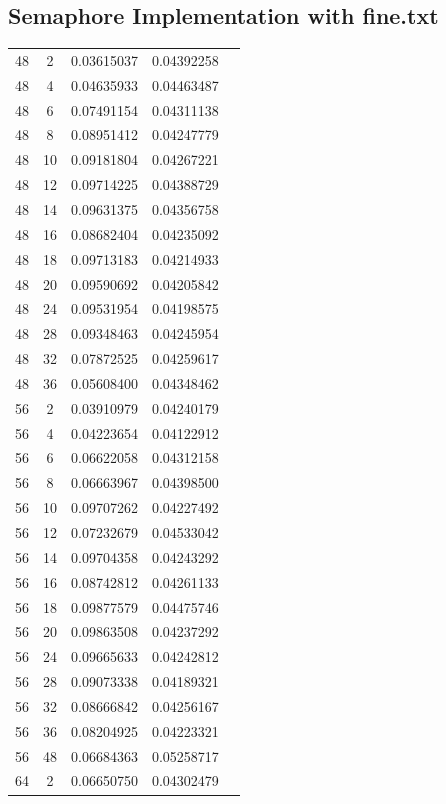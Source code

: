 \documentclass[letterpaper,12pt]{article}
\theoremstyle{remark}
\begin{document}
\subsection*{Semaphore Implementation  with fine.txt}
\begin{tabular}{ccccc}

48 & 2 & 0.03615037 & 0.04392258 \\
48 & 4 & 0.04635933 & 0.04463487 \\
48 & 6 & 0.07491154 & 0.04311138 \\
48 & 8 & 0.08951412 & 0.04247779 \\
48 & 10 & 0.09181804 & 0.04267221 \\
48 & 12 & 0.09714225 & 0.04388729 \\
48 & 14 & 0.09631375 & 0.04356758 \\
48 & 16 & 0.08682404 & 0.04235092 \\
48 & 18 & 0.09713183 & 0.04214933 \\
48 & 20 & 0.09590692 & 0.04205842 \\
48 & 24 & 0.09531954 & 0.04198575 \\
48 & 28 & 0.09348463 & 0.04245954 \\
48 & 32 & 0.07872525 & 0.04259617 \\
48 & 36 & 0.05608400 & 0.04348462 \\
56 & 2 & 0.03910979 & 0.04240179 \\
56 & 4 & 0.04223654 & 0.04122912 \\
56 & 6 & 0.06622058 & 0.04312158 \\
56 & 8 & 0.06663967 & 0.04398500 \\
56 & 10 & 0.09707262 & 0.04227492 \\
56 & 12 & 0.07232679 & 0.04533042 \\
56 & 14 & 0.09704358 & 0.04243292 \\
56 & 16 & 0.08742812 & 0.04261133 \\
56 & 18 & 0.09877579 & 0.04475746 \\
56 & 20 & 0.09863508 & 0.04237292 \\
56 & 24 & 0.09665633 & 0.04242812 \\
56 & 28 & 0.09073338 & 0.04189321 \\
56 & 32 & 0.08666842 & 0.04256167 \\
56 & 36 & 0.08204925 & 0.04223321 \\
56 & 48 & 0.06684363 & 0.05258717 \\
64 & 2 & 0.06650750 & 0.04302479 \\

\end{tabular}
\end{document}
